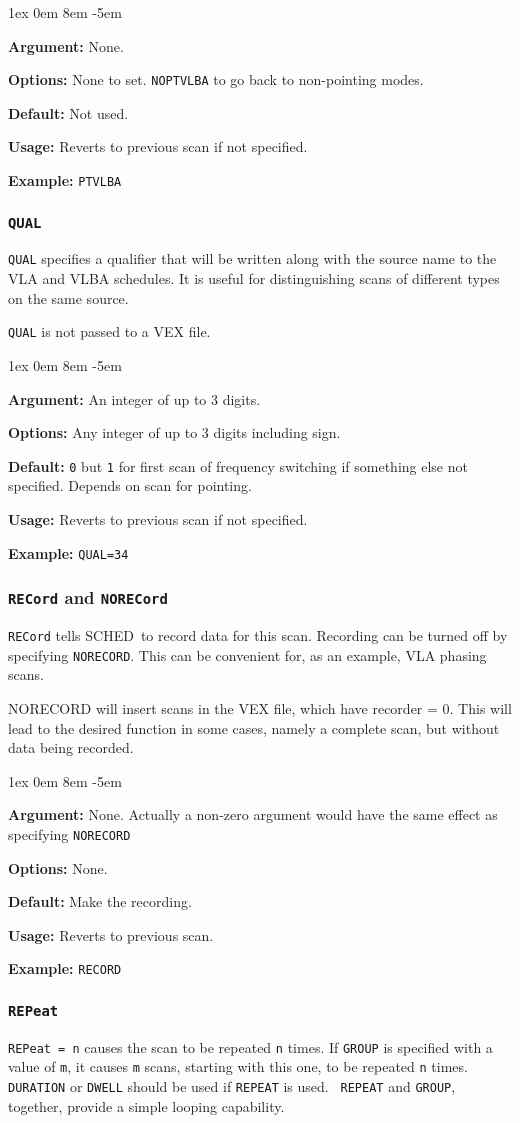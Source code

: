 \documentclass{report}
\newcommand{\schedb}{{\sc SCHED~}}
\newcommand{\rcwbox}[5]{
  \begin{list}{}{\parsep 1ex  \itemsep 0em
                 \leftmargin 8em  \itemindent -5em }
    \item {\bf Argument:} #1
    \item {\bf Options:}  #2
    \item {\bf Default:}  #3
    \item {\bf Usage:}    #4
    \item {\bf Example:}  #5
  \end{list}
}
\begin{document}
\rcwbox
{None.}
{None to set. {\tt NOPTVLBA} to go back to non-pointing modes.}
{Not used.}
{Reverts to previous scan if not specified.}
{{\tt PTVLBA}}


\subsubsection{\label{MP:QUAL}{\tt QUAL}}

{\tt QUAL} specifies a qualifier that will be written along with the
source name to the VLA and VLBA schedules. It is useful for
distinguishing scans of different types on the same source.

{\tt QUAL} is not passed to a VEX file.

\rcwbox
{An integer of up to 3 digits.}
{Any integer of up to 3 digits including sign.}
{{\tt 0} but {\tt 1} for first scan of frequency switching if
something else not specified. Depends on scan for pointing.}
{Reverts to previous scan if not specified.}
{{\tt QUAL=34}}


\subsubsection{\label{MP:RECORD}{\tt RECord} and {\tt NORECord}}

{\tt RECord} tells \schedb to record data for
this scan.  Recording can be turned off by specifying {\tt NORECORD}.
This can be convenient for, as an example, VLA phasing scans.

NORECORD will insert scans in the VEX file, which have recorder = 0.
This will lead to the desired function in some cases, namely a
complete scan, but without data being recorded.

\rcwbox
{None.  Actually a non-zero argument would have the same effect as
specifying {\tt NORECORD}}
{None.}
{Make the recording.}
{Reverts to previous scan.}
{{\tt RECORD}}


\subsubsection{\label{MP:REPEAT}{\tt REPeat}}

{\tt REPeat = n} causes the scan to be repeated {\tt n} times.  If
{\tt GROUP} is specified with a value of {\tt m}, it causes {\tt m}
scans, starting with this one, to be repeated {\tt n} times. {\tt
DURATION} or {\tt DWELL} should be used if {\tt REPEAT} is used. {\tt
REPEAT} and {\tt GROUP}, together, provide a simple looping
capability.
\end{document}
